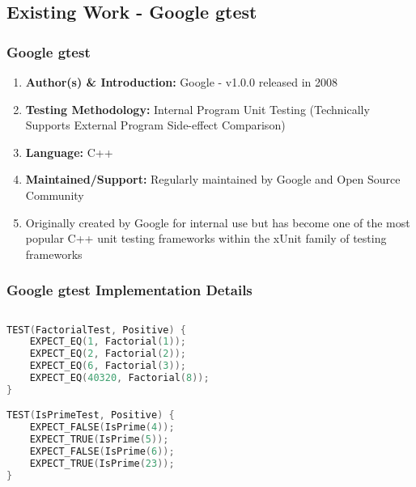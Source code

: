 \documentclass[xcolor]{beamer}
\begin{document}
\subsection{Existing Work - Google gtest}
\begin{frame}
	\frametitle{Google gtest}
	\begin{enumerate}
		\setlength\itemsep{1em}
		\item \textbf{Author(s) \& Introduction:} Google - v1.0.0 released in 2008
			\pause
		\item \textbf{Testing Methodology:} Internal Program Unit Testing (Technically Supports External Program Side-effect Comparison)
			\pause
		\item \textbf{Language:} C++
			\pause
		\item \textbf{Maintained/Support:} Regularly maintained by Google and Open Source Community
			\pause 
		\item Originally created by Google for internal use but has become one of the most popular C++ unit testing frameworks within the xUnit family of testing frameworks
	\end{enumerate}
\end{frame}
\begin{frame}[fragile]
	\frametitle{Google gtest Implementation Details}
	\begin{columns}
		\begin{column}{0.45\textwidth}
			\centering
\begin{lstlisting}[language=c, breaklines=true, caption={gtest test cases}]
TEST(FactorialTest, Positive) {
    EXPECT_EQ(1, Factorial(1));
    EXPECT_EQ(2, Factorial(2));
    EXPECT_EQ(6, Factorial(3));
    EXPECT_EQ(40320, Factorial(8));
}

TEST(IsPrimeTest, Positive) {
    EXPECT_FALSE(IsPrime(4));
    EXPECT_TRUE(IsPrime(5));
    EXPECT_FALSE(IsPrime(6));
    EXPECT_TRUE(IsPrime(23));
}
\end{lstlisting}
		\end{column}
		\begin{column}{0.45\textwidth}
			\centering
		\end{column}
	\end{columns}
\end{frame}
\end{document}
